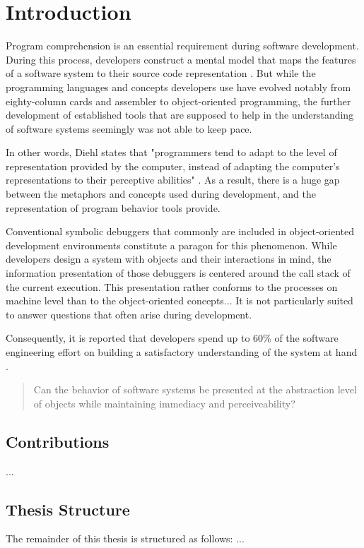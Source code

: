 \chapter{Introduction}
\label{c:introduction}

Program comprehension is an essential requirement during software development.
During this process, developers construct a mental model that maps the features of a software system to their source code representation \cite{latoza_maintaining_2006}.
But while the programming languages and concepts developers use have evolved notably from eighty-column cards and assembler to object-oriented programming, the further development of established tools that are supposed to help in the understanding of software systems seemingly was not able to keep pace.

In other words, Diehl states that "programmers tend to adapt to the level of representation provided by the computer, instead of adapting the computer's representations to their perceptive abilities" \cite{diehl_software_2007}.
As a result, there is a huge gap between the metaphors and concepts used during development, and the representation of program behavior tools provide.

Conventional symbolic debuggers that commonly are included in object-oriented development environments constitute a paragon for this phenomenon.
While developers design a system with objects and their interactions in mind, the information presentation of those debuggers is centered around the call stack of the current execution.
This presentation rather conforms to the processes on machine level than to the object-oriented concepts...
It is not particularly suited to answer questions that often arise during development.

Consequently, it is reported that developers spend up to 60\% of the software engineering effort on building a satisfactory understanding of the system at hand \cite{corbi_program_1989, basili_evolving_1997, ducasse_class_2005, rothlisberger_feature_2007, cornelissen_execution_2008}.


\begin{quote}
Can the behavior of software systems be presented at the abstraction level of objects while maintaining immediacy and perceiveability?
\end{quote}

\section{Contributions}
\label{s:contributions}

\begin{description}[leftmargin=0pt]
\item[First Contribution]
...
\end{description}



\section{Thesis Structure}
\label{s:structure}

The remainder of this thesis is structured as follows:
...

% 
% 
